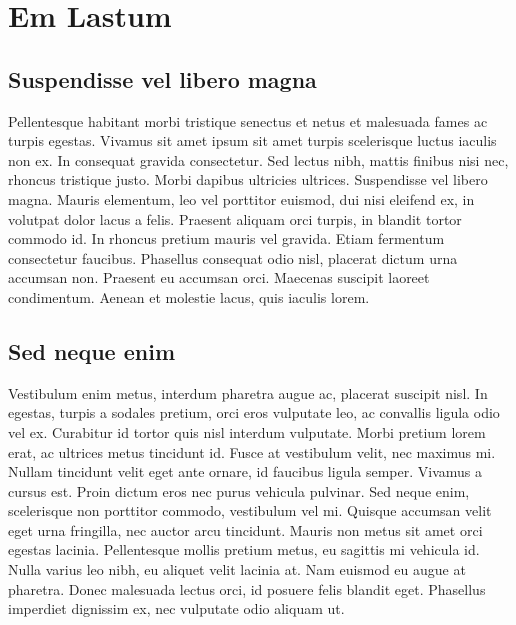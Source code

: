 \chapter{Em Lastum}

\section{Suspendisse vel libero magna}
Pellentesque habitant morbi tristique senectus et netus et malesuada fames ac turpis egestas.
 Vivamus sit amet ipsum sit amet turpis scelerisque luctus iaculis non ex. In consequat 
 gravida consectetur. Sed lectus nibh, mattis finibus nisi nec, rhoncus tristique justo. 
 Morbi dapibus ultricies ultrices. Suspendisse vel libero magna. Mauris elementum, leo 
 vel porttitor euismod, dui nisi eleifend ex, in volutpat dolor lacus a felis. Praesent
 aliquam orci turpis, in blandit tortor commodo id. In rhoncus pretium mauris vel gravida. 
 Etiam fermentum consectetur faucibus. Phasellus consequat odio nisl, placerat dictum urna 
 accumsan non. Praesent eu accumsan orci. Maecenas suscipit laoreet condimentum. Aenean et 
 molestie lacus, quis iaculis lorem.
 
\section{Sed neque enim}
 Vestibulum enim metus, interdum pharetra augue ac, placerat suscipit nisl. In egestas, 
 turpis a sodales pretium, orci eros vulputate leo, ac convallis ligula odio vel ex. 
 Curabitur id tortor quis nisl interdum vulputate. Morbi pretium lorem erat, ac ultrices
 metus tincidunt id. Fusce at vestibulum velit, nec maximus mi. Nullam tincidunt velit 
 eget ante ornare, id faucibus ligula semper. Vivamus a cursus est. Proin dictum eros nec 
 purus vehicula pulvinar. Sed neque enim, scelerisque non porttitor commodo, vestibulum 
 vel mi. Quisque accumsan velit eget urna fringilla, nec auctor arcu tincidunt. Mauris 
 non metus sit amet orci egestas lacinia. Pellentesque mollis pretium metus, eu sagittis
 mi vehicula id. Nulla varius leo nibh, eu aliquet velit lacinia at. Nam euismod eu augue 
 at pharetra. Donec malesuada lectus orci, id posuere felis blandit eget. Phasellus 
 imperdiet dignissim ex, nec vulputate odio aliquam ut.
 
